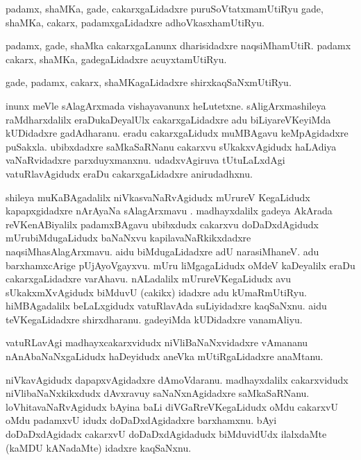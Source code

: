 \documentclass{article}
\begin{document}
\begin{mn}%
padamx, shaMKa, gade, cakarxgaLidadxre puruSoVtatxmamUtiRyu gade, shaMKa, cakarx, 
padamxgaLidadxre adhoVkasxhamUtiRyu.
\end{mn}

\begin{mn}%
padamx, gade, shaMka cakarxgaLanunx dharisidadxre naqsiMhamUtiR. padamx cakarx, shaMKa, 
gadegaLidadxre acuyxtamUtiRyu.
\end{mn}

\begin{mn}%
gade, padamx, cakarx, shaMKagaLidadxre shirxkaqSaNxmUtiRyu.
\end{mn}

\begin{mn}%
inunx meVle sAlagArxmada vishayavanunx heLutetxne. sAligArxmashileya raMdharxdalilx 
eraDukaDeyalUlx cakarxgaLidadxre adu biLiyareVKeyiMda kUDidadxre gadAdharanu. eradu 
cakarxgaLidudx muMBAgavu keMpAgidadxre puSakxla. ubibxdadxre saMkaSaRNanu cakarxvu 
sUkakxvAgidudx haLAdiya vaNaRvidadxre parxduyxmanxnu. udadxvAgiruva tUtuLaLxdAgi 
vatuRlavAgidudx eraDu cakarxgaLidadxre anirudadhxnu.
\end{mn}

\begin{mn}%
shileya muKaBAgadalilx niVkasvaNaRvAgidudx mUrureV KegaLidudx kapapxgidadxre nArAyaNa 
sAlagArxmavu . madhayxdalilx gadeya AkArada  reVKenABiyalilx padamxBAgavu ubibxdudx 
cakarxvu doDaDxdAgidudx mUrubiMdugaLidudx baNaNxvu kapilavaNaRkikxdadxre 
naqsiMhasAlagArxmavu. aidu biMdugaLidadxre adU narasiMhaneV. adu barxhamxcArige 
pUjAyoVgayxvu. mUru liMgagaLidudx oMdeV kaDeyalilx eraDu cakarxgaLidadxre varAhavu. 
nALadalilx mUrureVKegaLidudx avu sUkakxmXvAgidudx biMduvU (cakikx) idadxre adu 
kUmaRmUtiRyu. hiMBAgadalilx beLaLxgidudx vatuRlavAda suLiyidadxre kaqSaNxnu. aidu 
teVKegaLidadxre shirxdharanu. gadeyiMda kUDidadxre vanamAliyu.
\end{mn}

\begin{mn}%
vatuRLavAgi madhayxcakarxvidudx niVliBaNaNxvidadxre vAmananu nAnAbaNaNxgaLidudx haDeyidudx 
aneVka mUtiRgaLidadxre anaMtanu.
\end{mn}

\begin{mn}%
niVkavAgidudx dapapxvAgidadxre dAmoVdaranu. madhayxdalilx cakarxvidudx niVlibaNaNxkikxdudx 
dAvxravuy saNaNxnAgidadxre saMkaSaRNanu. loVhitavaNaRvAgidudx bAyina baLi 
diVGaRreVKegaLidudx oMdu cakarxvU oMdu padamxvU idudx doDaDxdAgidadxre barxhamxnu. bAyi 
doDaDxdAgidadx cakarxvU doDaDxdAgidadudx biMduvidUdx ilalxdaMte (kaMDU kANadaMte) idadxre 
kaqSaNxnu.
\end{mn}
\end{document}
